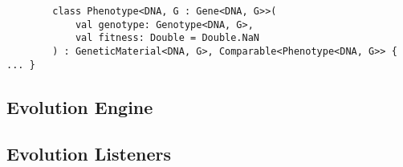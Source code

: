       \begin{verbatim}
        class Phenotype<DNA, G : Gene<DNA, G>>(
            val genotype: Genotype<DNA, G>,
            val fitness: Double = Double.NaN
        ) : GeneticMaterial<DNA, G>, Comparable<Phenotype<DNA, G>> { ... }
      \end{verbatim}
      
  \subsection{Evolution Engine}
  \label{sec:keen:ga:engine}
    \Blindtext
  \subsection{Evolution Listeners}
  \label{sec:keen:ga:listeners}
    \Blindtext
